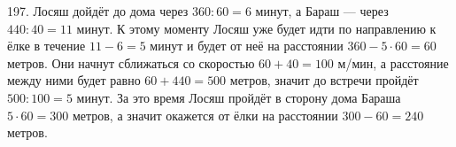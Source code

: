 197. Лосяш дойдёт до дома через $360:60=6$ минут, а Бараш --- через $440:40=11$ минут. К этому моменту Лосяш уже будет идти по направлению к ёлке в течение $11-6=5$ минут и будет от неё на расстоянии $360-5\cdot60=60$ метров. Они начнут сближаться со скоростью $60+40=100$ м/мин, а расстояние между ними будет равно $60+440=500$ метров, значит до встречи пройдёт $500:100=5$ минут. За это время Лосяш пройдёт в сторону дома Бараша $5\cdot60=300$ метров, а значит окажется от ёлки на расстоянии $300-60=240$ метров.\\

